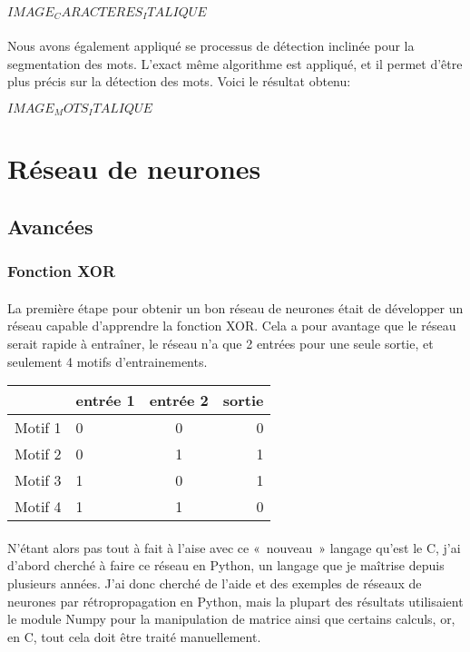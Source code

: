 \documentclass{article}
\begin{document}
    $IMAGE_CARACTERES_ITALIQUE$

    \paragraph{}
    Nous avons également appliqué se processus de détection inclinée pour la segmentation des mots. L'exact même algorithme est appliqué, et il permet d'être plus précis sur la détection des mots. Voici le résultat obtenu:

    $IMAGE_MOTS_ITALIQUE$
	
\newpage

\section{Réseau de neurones}

\subsection{Avancées}

\subsubsection{Fonction XOR}

\paragraph{} La première étape pour obtenir un bon réseau de neurones était de développer un réseau capable d'apprendre la fonction XOR. Cela a pour avantage que le réseau serait rapide à entraîner, le réseau n'a que 2 entrées pour une seule sortie, et seulement 4 motifs d'entrainements.

\begin{center}
\vspace*{0.2cm}
\begin{tabular}{|l|l|c|r|}
  \hline
  & entrée 1 & entrée 2 & sortie \\
  \hline
  Motif 1 & 0 & 0 & 0 \\
  Motif 2 & 0 & 1 & 1 \\
  Motif 3 & 1 & 0 & 1 \\
  Motif 4 & 1 & 1 & 0 \\
  \hline
\end{tabular}
\end{center}


\paragraph{}N'étant alors pas tout à fait à l'aise avec ce « nouveau » langage qu'est le C, j'ai d'abord cherché à faire ce réseau en Python, un langage que je maîtrise depuis plusieurs années. J'ai donc cherché de l'aide et des exemples de réseaux de neurones par rétropropagation en Python, mais la plupart des résultats utilisaient le module Numpy pour la manipulation de matrice ainsi que certains calculs, or, en C, tout cela doit être traité manuellement.
\end{document}
